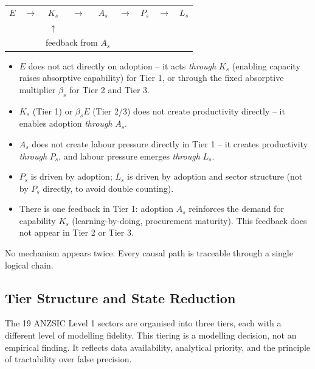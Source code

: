\documentclass[11pt,a4paper]{article}
\begin{document}
\begin{center}
\begin{tabular}{ccccccccc}
$E$ & $\rightarrow$ & $K_s$ & $\rightarrow$ & $A_s$ & $\rightarrow$ & $P_s$ & $\rightarrow$ & $L_s$ \\
& & $\uparrow$ & & & & & & \\
& & \multicolumn{3}{c}{feedback from $A_s$} & & & &
\end{tabular}
\end{center}

\begin{itemize}
  \item $E$ does not act directly on adoption -- it acts \emph{through} $K_s$ (enabling capacity raises absorptive capability) for Tier 1, or through the fixed absorptive multiplier $\beta_s$ for Tier 2 and Tier 3.
  \item $K_s$ (Tier 1) or $\beta_s E$ (Tier 2/3) does not create productivity directly -- it enables adoption \emph{through} $A_s$.
  \item $A_s$ does not create labour pressure directly in Tier 1 -- it creates productivity \emph{through} $P_s$, and labour pressure emerges \emph{through} $L_s$.
  \item $P_s$ is driven by adoption; $L_s$ is driven by adoption and sector structure (not by $P_s$ directly, to avoid double counting).
  \item There is one feedback in Tier 1: adoption $A_s$ reinforces the demand for capability $K_s$ (learning-by-doing, procurement maturity). This feedback does not appear in Tier 2 or Tier 3.
\end{itemize}

No mechanism appears twice. Every causal path is traceable through a single logical chain.

\subsection{Tier Structure and State Reduction}
\label{sec:tiers}

The 19 ANZSIC Level 1 sectors are organised into three tiers, each with a different level of modelling fidelity. This tiering is a modelling decision, not an empirical finding. It reflects data availability, analytical priority, and the principle of tractability over false precision.
\end{document}
